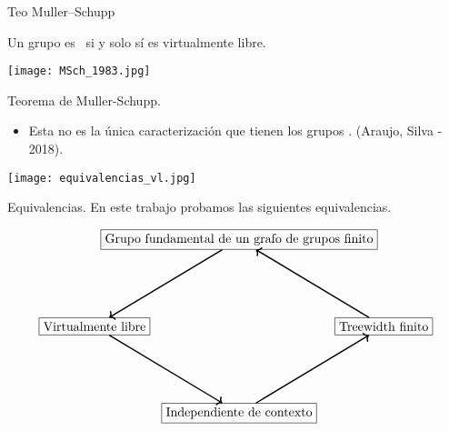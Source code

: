 \documentclass[aspectratio=169, 11pt]{beamer}
\begin{document}
	\begin{frame}[fragile]{Teo Muller--Schupp}
		
		\begin{teo}
			Un grupo es \ic \ si y solo sí  es virtualmente libre.
		\end{teo}
		
		\begin{center}
			\texttt{[image: MSch\_1983.jpg]}
		\end{center}
	
		
	\end{frame}
	
	
	\begin{frame}[fragile]{Teorema de Muller-Schupp.}
		\begin{itemize}
			\item 
				Esta no es la única caracterización que tienen los grupos \vl. 
				(Araujo, Silva - 2018).
		\end{itemize}
		
		
		\begin{center}
			\texttt{[image: equivalencias\_vl.jpg]}
		\end{center}		
	
	\end{frame}	
	
	\begin{frame}[fragile]{Equivalencias.}
		En este trabajo probamos las siguientes equivalencias.
		
		\[	
		\begin{tikzpicture}[scale=0.8]
			\path 
			(0,0) node(a) [rectangle,draw] {Grupo fundamental de un grafo de grupos finito}
			(5,-3) node(b) [rectangle,draw] {Treewidth finito}
			(0,-6) node(c) [rectangle,draw] {Independiente de contexto}
			(-5,-3) node (d) [rectangle,draw] {Virtualmente libre};
			\draw   
			(d) edge[<-,line width=1.0pt] (a) 
			(c) edge[<-,line width=1.0pt] (d)
			(b) edge[<-,line width=1.0pt] (c)
			(a)  edge[<-,line width=1.0pt] (b);
		\end{tikzpicture}
		\]
	\end{frame}
	
	
	
\end{document}
